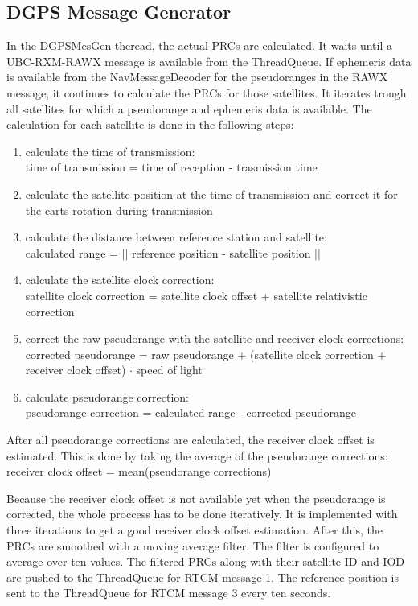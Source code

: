 \subsection{DGPS Message Generator}

In the DGPSMesGen theread, the actual PRCs are calculated.
It waits until a UBC-RXM-RAWX message is available from the ThreadQueue.
If ephemeris data is available from the NavMessageDecoder for the pseudoranges in the RAWX message, it continues to calculate the PRCs for those satellites.
It iterates trough all satellites for which a pseudorange and ephemeris data is available.
The calculation for each satellite is done in the following steps:
\begin{enumerate}
 \setlength\itemsep{0.1cm}
 \item calculate the time of transmission: \\
 time of transmission = time of reception - trasmission time
 \item calculate the satellite position at the time of transmission and correct it for the earts rotation during transmission
 \item calculate the distance between reference station and satellite: \\
 calculated range = $\lvert \lvert$ reference position - satellite position $\rvert \rvert$
 \item calculate the satellite clock correction: \\
 satellite clock correction = satellite clock offset + satellite relativistic correction
 \item correct the raw pseudorange with the satellite and receiver clock corrections: \\
 corrected pseudorange = raw pseudorange + (satellite clock correction + receiver clock offset) $\cdot$ speed of light
 \item calculate pseudorange correction: \\
 pseudorange correction = calculated range - corrected pseudorange
\end{enumerate}
After all pseudorange corrections are calculated, the receiver clock offset is estimated.
This is done by taking the average of the pseudorange corrections: \\
receiver clock offset = mean(pseudorange corrections)

Because the receiver clock offset is not available yet when the pseudorange is corrected, the whole proccess has to be done iteratively.
It is implemented with three iterations to get a good receiver clock offset estimation.
After this, the PRCs are smoothed with a moving average filter.
The filter is configured to average over ten values.
The filtered PRCs along with their satellite ID and IOD are pushed to the ThreadQueue for RTCM message 1.
The reference position is sent to the ThreadQueue for RTCM message 3 every ten seconds.


